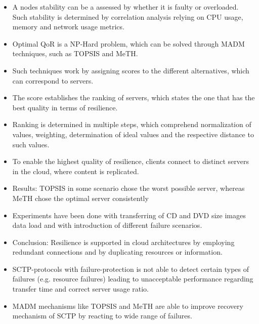 \begin{itemize}
	\item A nodes stability can be a assessed by whether it is faulty or overloaded. Such stability is determined by correlation analysis relying on CPU usage, memory and network usage metrics.
	\item Optimal QoR is a NP-Hard problem, which can be solved through MADM techniques, such as TOPSIS and MeTH.
	\item Such techniques work by assigning scores to the different alternatives, which can correspond to servers.
	\item The score establishes the ranking of servers, which states the one that has the best quality in terms of resilience.
	\item Ranking is determined in multiple steps, which comprehend normalization of values, weighting, determination of ideal values and the respective distance to such values.
	\item To enable the highest quality of resilience, clients connect to distinct servers in the cloud, where content is replicated.
	\item Results: TOPSIS in some scenario chose the worst possible server, whereas MeTH chose the optimal server consistently
	\item Experiments have been done with transferring of CD and DVD size images data load and with introduction of different failure scenarios.
	\item Conclusion: Resilience is supported in cloud architectures by employing redundant connections and by duplicating resources or information.
	\item SCTP-protocols with failure-protection is not able to detect certain types of failures (e.g. resource failures) leading to unacceptable performance regarding transfer time and correct server usage ratio.
	\item MADM mechanisms like TOPSIS and MeTH are able to improve recovery mechanism of SCTP by reacting  to wide range of failures.
\end{itemize}